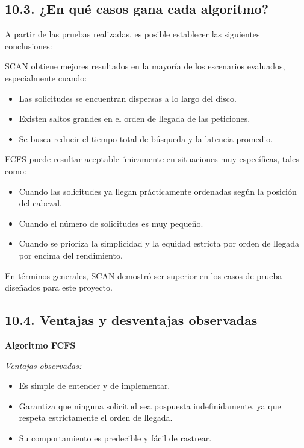 \documentclass[14pt,letterpaper]{extarticle}
\begin{document}
\subsection*{10.3. ¿En qué casos gana cada algoritmo?}

A partir de las pruebas realizadas, es posible establecer las siguientes conclusiones:

SCAN obtiene mejores resultados en la mayoría de los escenarios evaluados, especialmente cuando:

\begin{itemize}
    \item Las solicitudes se encuentran dispersas a lo largo del disco.
    \item Existen saltos grandes en el orden de llegada de las peticiones.
    \item Se busca reducir el tiempo total de búsqueda y la latencia promedio.
\end{itemize}

FCFS puede resultar aceptable únicamente en situaciones muy específicas, tales como:

\begin{itemize}
    \item Cuando las solicitudes ya llegan prácticamente ordenadas según la posición del cabezal.
    \item Cuando el número de solicitudes es muy pequeño.
    \item Cuando se prioriza la simplicidad y la equidad estricta por orden de llegada por encima del rendimiento.
\end{itemize}

En términos generales, SCAN demostró ser superior en los casos de prueba diseñados para este proyecto.

\subsection*{10.4. Ventajas y desventajas observadas}

\textbf{Algoritmo FCFS}

\textit{Ventajas observadas:}
\begin{itemize}
    \item Es simple de entender y de implementar.
    \item Garantiza que ninguna solicitud sea pospuesta indefinidamente, ya que respeta estrictamente el orden de llegada.
    \item Su comportamiento es predecible y fácil de rastrear.
\end{itemize}
\end{document}
